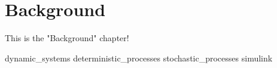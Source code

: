 \chapter{Background}

This is the "Background" chapter!


{dynamic_systems}
{deterministic_processes}
{stochastic_processes}
{simulink}            
